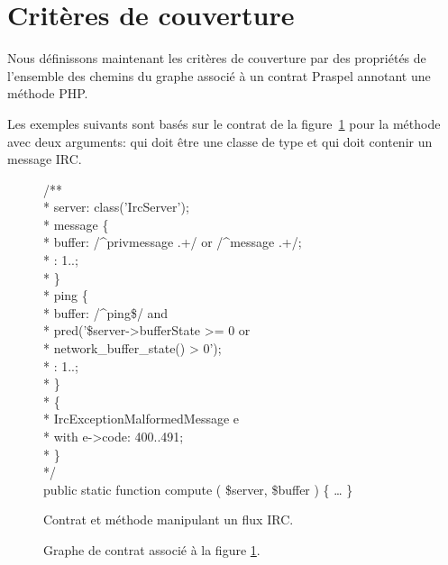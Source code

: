\section{Critères de couverture}
\label{section:test:criteria}

Nous définissons maintenant les critères de couverture par des propriétés de
l'ensemble des chemins du graphe associé à un contrat Praspel annotant une
méthode PHP.

Les exemples suivants sont basés sur le contrat de la
figure~\ref{figure:test:irc} pour la méthode  avec deux arguments:
 qui doit être une classe de type
 et  qui doit contenir un message
IRC.
%
\begin{figure}

\begin{bigpre}
/** \\
 * \arequires server: class('\bslash{}Irc\bslash{}Server'); \\
 * \abehavior message \{ \\
 *     \arequires buffer: /^privmessage .+/ or /^message .+/; \\
 *     \aensures  \aresult: 1..; \\
 * \} \\
 * \abehavior ping \{ \\
 *     \arequires buffer: /^ping\$/ and \\
 *               \bslash{}pred('\$server->bufferState   >= 0 or \\
 *                      network\_buffer\_state() >  0'); \\
 *     \aensures  \aresult: 1..; \\
 * \} \\
 * \adefault \{ \\
 *     \athrowable \bslash{}Irc\bslash{}Exception\bslash{}MalformedMessage e \\
 *                    with e->code: 400..491; \\
 * \} \\
 */ \\
public static function compute ( \$server, \$buffer ) \{ … \}
\end{bigpre}

\caption{\label{figure:test:irc} Contrat et méthode manipulant un flux IRC.}

\end{figure}
%
\begin{figure}


\caption{\label{figure:test:irc_graph} Graphe de contrat associé à la figure
\ref{figure:test:irc}.}

\end{figure}
